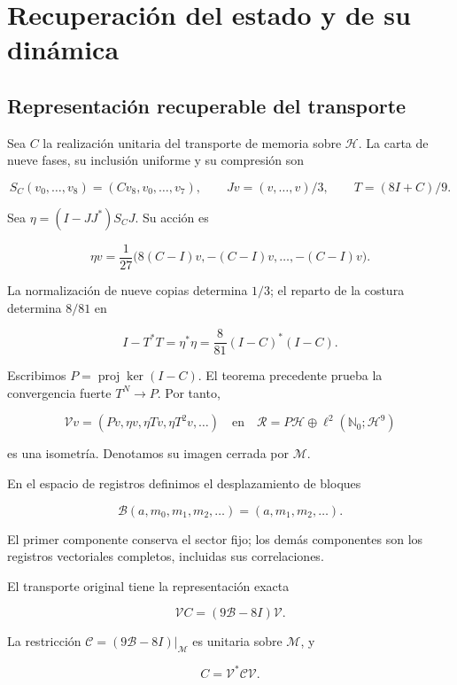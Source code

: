 \section{Recuperación del estado y de su dinámica}
\label{nuclear:3}
\subsection{Representación recuperable del transporte}

Sea \(C\) la realización unitaria del transporte de memoria sobre \(\mathcal H\). La carta de nueve fases, su inclusión uniforme y su compresión son

\[
S_C(v_0,\ldots,v_8)=(Cv_8,v_0,\ldots,v_7),\qquad
Jv=(v,\ldots,v)/3,\qquad T=(8I+C)/9.
\]

Sea \(\eta=(I-JJ^*)S_CJ\). Su acción es

\[
\eta v=\frac1{27}\bigl(8(C-I)v,-(C-I)v,\ldots,-(C-I)v\bigr).
\]

La normalización de nueve copias determina \(1/3\); el reparto de la costura determina \(8/81\) en

\begin{equation}
I-T^*T=\eta^*\eta=\frac8{81}(I-C)^*(I-C).
\label{nuc03:eq:1}
\end{equation}

Escribimos \(P=\operatorname{proj}\ker(I-C)\). El teorema precedente prueba la convergencia fuerte \(T^N\to P\). Por tanto,

\begin{equation}
\mathcal Vv=(Pv,\eta v,\eta Tv,\eta T^2v,\ldots)
\quad\text{en}\quad
\mathcal R=P\mathcal H\oplus\ell^2(\mathbb N_0;\mathcal H^9)
\label{nuc03:eq:2}
\end{equation}

es una isometría. Denotamos su imagen cerrada por \(\mathcal M\).

En el espacio de registros definimos el desplazamiento de bloques

\begin{equation}
\mathcal B(a,m_0,m_1,m_2,\ldots)=(a,m_1,m_2,\ldots).
\label{nuc03:eq:3}
\end{equation}

El primer componente conserva el sector fijo; los demás componentes son los registros vectoriales completos, incluidas sus correlaciones.

\begin{theorem}
\label{nuc03:transporte}
El transporte original tiene la representación exacta

\begin{equation}
\boxed{\mathcal V C=(9\mathcal B-8I)\mathcal V.}
\label{nuc03:eq:4}
\end{equation}

La restricción \(\mathcal C=(9\mathcal B-8I)|_{\mathcal M}\) es unitaria sobre \(\mathcal M\), y

\begin{equation}
C=\mathcal V^*\mathcal C\mathcal V.
\label{nuc03:eq:5}
\end{equation}
\end{theorem}

